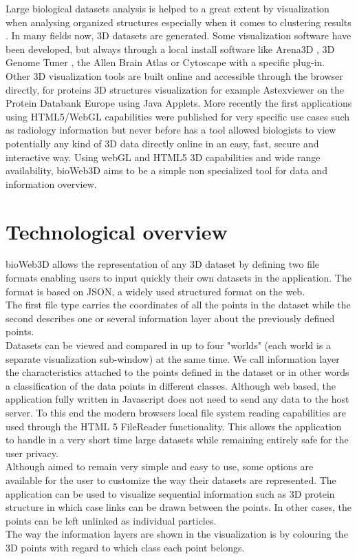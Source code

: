 \documentclass{bioinfo}
\begin{document}
Large biological datasets analysis is helped to a great extent by visualization when analysing organized structures especially when it comes to clustering results \citep{Rubel10}. In many fields now, 3D datasets are generated. Some visualization software have been developed, but always through a local install software like Arena3D \citep{Pavlopoulos08},  3D Genome Tuner \citep{Wang09}, the Allen Brain Atlas \citep{Lein07} or Cytoscape \citep{Shannon03} with a specific plug-in. Other 3D visualization tools are built online and accessible through the browser directly, for proteins 3D structures visualization for example Astexviewer \citep{Hartshorn02} on the Protein Databank Europe using Java Applets. More recently the first applications using HTML5/WebGL capabilities were published for very specific use cases such as radiology information \citep{Dinesh12} but never before has a tool allowed biologists to view potentially any kind of 3D data directly online in an easy, fast, secure and interactive way. Using webGL and HTML5 3D capabilities and wide range availability, bioWeb3D aims to be a simple non specialized tool for data and information overview.



\section{Technological overview}

bioWeb3D allows the representation of any 3D dataset by defining two file formats enabling users to input quickly their own datasets in the application. The format is based on JSON, a widely used structured format on the web.\\
The first file type carries the coordinates of all the points in the dataset while the second describes one or several information layer about the previously defined points.\\
Datasets can be viewed and compared in up to four "worlds" (each world is a separate visualization sub-window) at the same time. We call information layer the characteristics attached to the points defined in the dataset or in other words a classification of the data points in different classes.  Although web based, the application fully written in Javascript does not need to send any data to the host server. To this end the modern browsers local file system reading capabilities are used through the HTML 5 FileReader functionality. This allows the application to handle in a very short time large datasets while remaining entirely safe for the user privacy. \\
Although aimed to remain very simple and easy to use, some options are available for the user to customize the way their datasets are represented. The application can be used to visualize sequential information such as 3D protein structure in which case links can be drawn between the points. In other cases, the points can be left unlinked as individual particles. \\
The way the information layers are shown in the visualization is by colouring the 3D points with regard to which class each point belongs.\\
\end{document}
